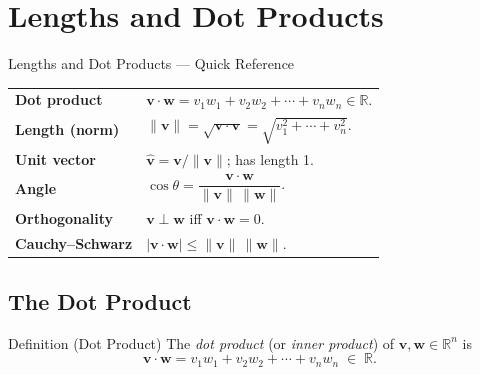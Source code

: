 
\section{Lengths and Dot Products}

\begin{toolkitbox}{Lengths and Dot Products --- Quick Reference}
\begin{tabular}{@{}p{}p{}@{}}
\textbf{Dot product}     & $\mathbf{v} \cdot \mathbf{w} = v_1w_1 + v_2w_2 + \cdots + v_nw_n \in \mathbb{R}$. \\[4pt]
\textbf{Length (norm)}   & $\|\mathbf{v}\| = \sqrt{\mathbf{v} \cdot \mathbf{v}} = \sqrt{v_1^2 + \cdots + v_n^2}$. \\[4pt]
\textbf{Unit vector}     & $\hat{\mathbf{v}} = \mathbf{v}/\|\mathbf{v}\|$; has length 1. \\[4pt]
\textbf{Angle}           & $\cos\theta = \dfrac{\mathbf{v} \cdot \mathbf{w}}{\|\mathbf{v}\|\,\|\mathbf{w}\|}$. \\[6pt]
\textbf{Orthogonality}   & $\mathbf{v} \perp \mathbf{w}$ iff $\mathbf{v} \cdot \mathbf{w} = 0$. \\[4pt]
\textbf{Cauchy--Schwarz} & $|\mathbf{v} \cdot \mathbf{w}| \leq \|\mathbf{v}\|\,\|\mathbf{w}\|$. \\
\end{tabular}
\end{toolkitbox}

\subsection*{The Dot Product}

\begin{propositionbox}{Definition (Dot Product)}
The \emph{dot product} (or \emph{inner product}) of $\mathbf{v}, \mathbf{w} \in \mathbb{R}^n$ is
\[
  \mathbf{v} \cdot \mathbf{w} = v_1 w_1 + v_2 w_2 + \cdots + v_n w_n \;\in\; \mathbb{R}.
\]
\end{propositionbox}

